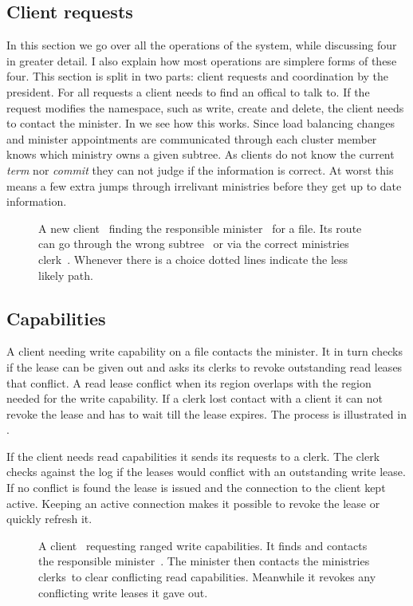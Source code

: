 \subsection{Client requests} %
In this section we go over all the operations of the system, while discussing four in greater detail. I also explain how most operations are simplere forms of these four. This section is split in two parts: client requests and coordination by the president.
%
For all requests a client needs to find an offical to talk to. If the request modifies the namespace, such as write, create and delete, the client needs to contact the minister. In  we see how this works. Since load balancing changes and minister appointments are communicated through \raft{} each cluster member knows which ministry owns a given subtree. As clients do not know the current \raft{} \textit{term} nor \textit{commit} they can not judge if the information is correct. At worst this means a few extra jumps through irrelivant ministries before they get up to date information.
%
\begin{figure}[htbp]
	\centering
	
	\caption{A new client~\clientLeg{} finding the responsible minister~\amdsLeg{} for a file. Its route can go through the wrong subtree~\umdsLeg{} or via the correct ministries clerk~\cmdsLeg{}. Whenever there is a choice dotted lines indicate the less likely path.}
	\label{fig:find_aMDS}
\end{figure}
%
\subsection*{Capabilities} 
A client needing write capability on a file contacts the minister. It in turn checks if the lease can be given out and asks its clerks to revoke outstanding read leases that conflict. A read lease conflict when its region overlaps with the region needed for the write capability. If a clerk lost contact with a client it can not revoke the lease and has to wait till the lease expires. The process is illustrated in . 

If the client needs read capabilities it sends its requests to a clerk. The clerk checks against the \raft{} log if the leases would conflict with an outstanding write lease. If no conflict is found the lease is issued and the connection to the client kept active. Keeping an active connection makes it possible to revoke the lease or quickly refresh it.
%
\begin{figure}[htbp]
	\centering
	
	\caption{A client~\clientLeg{} requesting ranged write capabilities. It finds and contacts the responsible minister~\amdsLeg{}. The minister then contacts the ministries clerks~\cmdsLeg to clear conflicting read capabilities. Meanwhile it revokes any conflicting write leases it gave out.}
	\label{fig:write}
\end{figure}
%
